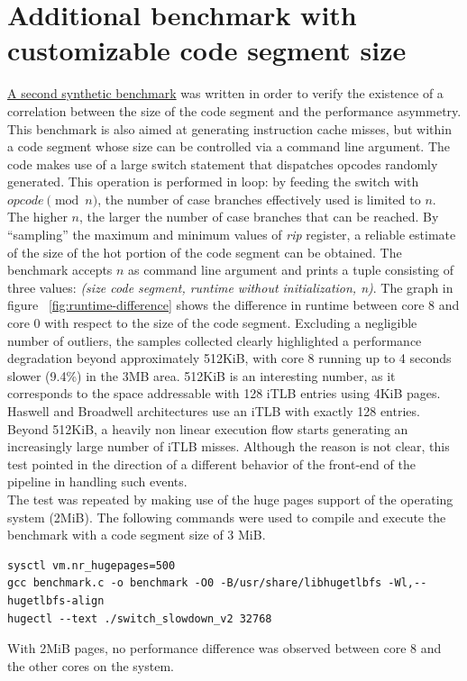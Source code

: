 \documentclass[a4paper]{jpconf}
\begin{document}
\section{Additional benchmark with customizable code segment size}
\label{section:benchmark-itlb}
\href{https://gitlab.cern.ch/snippets/217}{A second synthetic benchmark} 
was written in order to verify the existence of a 
correlation between the size of the code segment and the performance 
asymmetry. This benchmark is also aimed at generating instruction cache misses,
but within a code segment whose size can be controlled via a command line 
argument. The code makes use of a large switch statement that dispatches
opcodes randomly generated. This operation is performed in loop: 
by feeding the switch with $opcode\pmod n$, the number of case 
branches effectively used is limited to $n$. The higher $n$, the larger the
number of case branches that can be reached. By ``sampling'' the 
maximum and minimum values of \textit{rip} register, a reliable estimate of the 
size of the hot portion of the code segment can be obtained. The
benchmark accepts $n$ as command line argument and prints a tuple consisting of
three values: \textit{(size code segment, runtime without initialization, n)}.
The graph in figure ~\ref{fig:runtime-difference} shows the difference in runtime 
between core 8 and core 0 with respect to the size of the code segment. Excluding a
negligible number of outliers, the samples collected clearly highlighted a performance 
degradation beyond approximately 512KiB, with core 8 running up to 4 seconds slower
(9.4\%) in the 3MB area. 512KiB is an interesting number, as it 
corresponds to the space addressable with 128 iTLB entries using 4KiB pages. 
Haswell and Broadwell architectures use an iTLB with exactly 128 entries. 
Beyond 512KiB, a heavily non linear execution flow starts generating an increasingly 
large number of iTLB misses. Although the reason is not clear, this test pointed
in the direction of a different behavior of the front-end of the pipeline 
in handling such events.
\\
The test was repeated by making use of the huge pages support of the operating
system (2MiB). The following commands were used to compile and execute the benchmark
with a code segment size of 3 MiB.

\begin{lstlisting}
sysctl vm.nr_hugepages=500
gcc benchmark.c -o benchmark -O0 -B/usr/share/libhugetlbfs -Wl,--hugetlbfs-align
hugectl --text ./switch_slowdown_v2 32768
\end{lstlisting}
With 2MiB pages, no performance difference was observed between core 8 and the 
other cores on the system.
\end{document}

